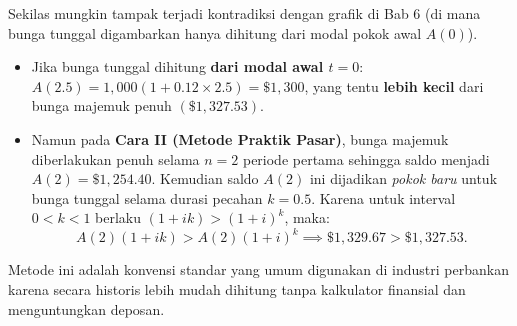 \documentclass[11pt,a4paper]{article}
\begin{document}
\begin{notebox}
Sekilas mungkin tampak terjadi kontradiksi dengan grafik di Bab 6 (di mana bunga tunggal digambarkan hanya dihitung dari modal pokok awal $A(0)$). 
\begin{itemize}
    \item Jika bunga tunggal dihitung \textbf{dari modal awal $t=0$}: 
    $A(2.5) = 1{,}000(1 + 0.12 \times 2.5) = \$1{,}300$, yang tentu \textbf{lebih kecil} dari bunga majemuk penuh $(\$1{,}327.53)$.
    \item Namun pada \textbf{Cara II (Metode Praktik Pasar)}, bunga majemuk diberlakukan penuh selama $n=2$ periode pertama sehingga saldo menjadi $A(2) = \$1{,}254.40$. Kemudian saldo $A(2)$ ini dijadikan \emph{pokok baru} untuk bunga tunggal selama durasi pecahan $k = 0.5$. Karena untuk interval $0 < k < 1$ berlaku $(1+ik) > (1+i)^k$, maka:
    \begin{equation*}
        A(2)(1 + ik) > A(2)(1+i)^k \implies \$1{,}329.67 > \$1{,}327.53.
    \end{equation*}
\end{itemize}
Metode ini adalah konvensi standar yang umum digunakan di industri perbankan karena secara historis lebih mudah dihitung tanpa kalkulator finansial dan menguntungkan deposan.
\end{notebox}
\end{document}
